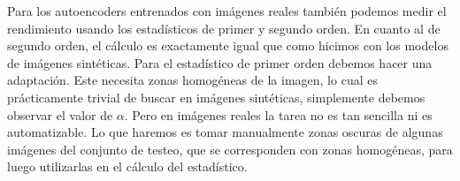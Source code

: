 Para los autoencoders entrenados con imágenes reales también podemos medir el rendimiento usando los estadísticos de primer y segundo orden. En cuanto al de segundo orden, el cálculo es exactamente igual que como hicimos con los modelos de imágenes sintéticas. Para el estadístico de primer orden debemos hacer una adaptación. Este necesita zonas homogéneas de la imagen, lo cual es prácticamente trivial de buscar en imágenes sintéticas, simplemente debemos observar el valor de $\alpha$. Pero en imágenes reales la tarea no es tan sencilla ni es automatizable. Lo que haremos es tomar manualmente zonas oscuras de algunas imágenes del conjunto de testeo, que se corresponden con zonas homogéneas, para luego utilizarlas en el cálculo del estadístico.